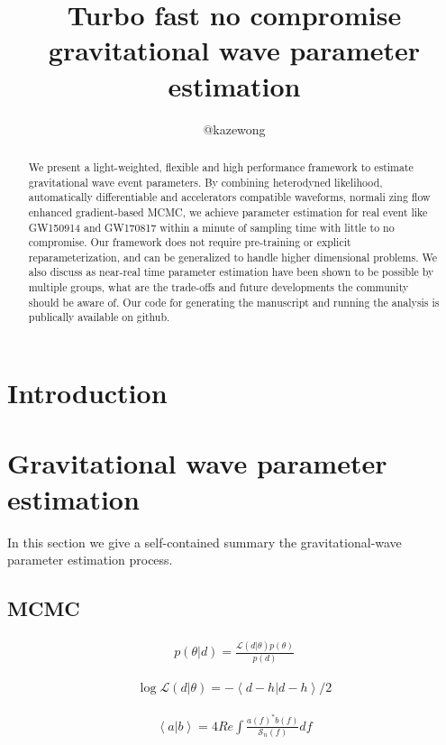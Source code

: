 \documentclass[twocolumn]{aastex631}
\begin{document}
\title{Turbo fast no compromise gravitational wave parameter estimation}

\author{@kazewong}

\begin{abstract}
We present a light-weighted, flexible and high performance framework to estimate
gravitational wave event parameters. By combining heterodyned likelihood,
automatically differentiable and accelerators compatible waveforms, normali zing
flow enhanced gradient-based MCMC, we achieve parameter estimation for real
event like GW150914 and GW170817 within a minute of sampling time with little to
no compromise. Our framework does not require pre-training or explicit
reparameterization, and can be generalized to handle higher dimensional
problems. We also discuss as near-real time parameter estimation have been shown
to be possible by multiple groups, what are the trade-offs and future
developments the community should be aware of. Our code for generating the
manuscript and running the analysis is publically available on github.
\end{abstract}

\section{Introduction}
\label{sec:intro}

\section{Gravitational wave parameter estimation}

In this section we give a self-contained summary the gravitational-wave parameter estimation process.

\subsection{MCMC}

\begin{align}
    p(\theta| d) = \frac{\mathcal{L}(d|\theta)p(\theta)}{p(d)}
\end{align}

\begin{align}
    \log{\mathcal{L}(d|\theta)} = -\left<d-h|d-h\right>/2
\end{align}

\begin{align}
    \left<a|b\right> = 4 Re\int \frac{a(f)^*b(f)}{\mathcal{S}_n(f)} df
\end{align}
\end{document}
